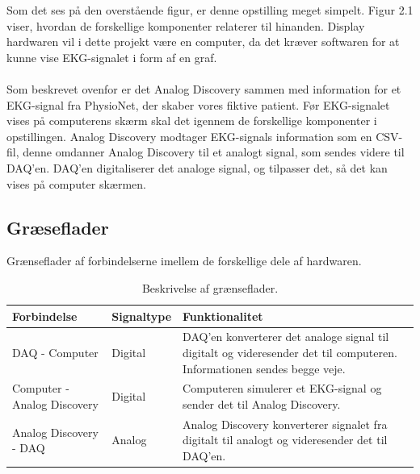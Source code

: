 Som det ses på den overstående figur, er denne opstilling meget simpelt. Figur 2.1 viser, hvordan de forskellige komponenter relaterer til hinanden. Display hardwaren vil i dette projekt være en computer, da det kræver softwaren for at kunne vise EKG-signalet i form af en graf.
\\
\\  
Som beskrevet ovenfor er det Analog Discovery sammen med information for et EKG-signal fra PhysioNet, der skaber vores fiktive patient. Før EKG-signalet vises på computerens skærm skal det igennem de forskellige komponenter i opstillingen. Analog Discovery modtager EKG-signals  information som en CSV-fil, denne omdanner Analog Discovery til et analogt signal, som sendes videre til DAQ’en. DAQ’en digitaliserer det analoge signal, og tilpasser det, så det kan vises på computer skærmen. 

\subsection{Græseflader}
Grænseflader af forbindelserne imellem de forskellige dele af hardwaren. 

\begin{table}[H] 
	\begin{tabularx}{\textwidth}{l l X}
    \toprule
     \textbf{Forbindelse}   & \textbf{Signaltype} & \textbf{Funktionalitet}    \\ \midrule
     DAQ - Computer         & Digital & DAQ'en konverterer det analoge signal til digitalt og videresender det til 							  computeren. Informationen sendes begge veje. \\ 
     					      \addlinespace[2mm]                                                                                                                                                                            
     Computer - Analog Discovery			& Digital & Computeren simulerer et EKG-signal og sender det til Analog Discovery.\\ 
     				    	  \addlinespace[2mm]   				                                                                                                                                                                           
     Analog Discovery - DAQ			   	& Analog & Analog Discovery	 konverterer signalet fra digitalt til analogt og videresender det til 							      DAQ'en.\\  				      
    \bottomrule                                                                                                                   
    \end{tabularx}
    \caption {Beskrivelse af grænseflader.}
    \label{tab:graenseflader}
\end{table}



